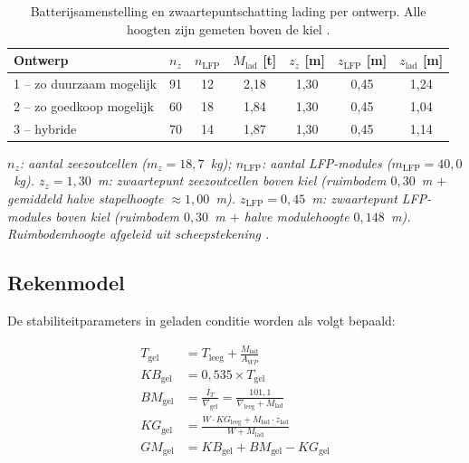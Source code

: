 \begin{table}[H]
\centering
\caption{Batterijsamenstelling en zwaartepuntschatting lading per ontwerp.
         Alle hoogten zijn gemeten boven de kiel \cite{JansjeTekening2026}.}
\label{tab:samenstelling}
\begin{tabular}{lcccccc}
\toprule
Ontwerp & $n_z$ & $n_\mathrm{LFP}$
        & $M_\mathrm{lad}$ [t]
        & $z_z$ [m] & $z_\mathrm{LFP}$ [m] & $z_\mathrm{lad}$ [m] \\
\midrule
1 -- zo duurzaam mogelijk & 91 & 12 & 2{,}18 & 1{,}30 & 0{,}45 & 1{,}24 \\
2 -- zo goedkoop mogelijk & 60 & 18 & 1{,}84 & 1{,}30 & 0{,}45 & 1{,}04 \\
3 -- hybride              & 70 & 14 & 1{,}87 & 1{,}30 & 0{,}45 & 1{,}14 \\
\bottomrule
\end{tabular}
\vspace{4pt}

\noindent\footnotesize
\textit{%
$n_z$: aantal zeezoutcellen ($m_z = 18{,}7$~kg);
$n_\mathrm{LFP}$: aantal LFP-modules ($m_\mathrm{LFP} = 40{,}0$~kg).
$z_z = 1{,}30$~m: zwaartepunt zeezoutcellen boven kiel
(ruimbodem $0{,}30$~m $+$ gemiddeld halve stapelhoogte $\approx 1{,}00$~m).
$z_\mathrm{LFP} = 0{,}45$~m: zwaartepunt LFP-modules boven kiel
(ruimbodem $0{,}30$~m $+$ halve modulehoogte $0{,}148$~m).
Ruimbodemhoogte afgeleid uit scheepstekening \cite{JansjeTekening2026}.}
\end{table}

\subsection{Rekenmodel}
\label{sec:stab_rekenmodel}

De stabiliteitparameters in geladen conditie worden als volgt bepaald:

\begin{align}
    T_\mathrm{gel}  &= T_\mathrm{leeg} + \frac{M_\mathrm{lad}}{A_{WP}}
    \label{eq:T_gel} \\[4pt]
    KB_\mathrm{gel} &= 0{,}535 \times T_\mathrm{gel}
    \label{eq:KB_gel} \\[4pt]
    BM_\mathrm{gel} &= \frac{I_T}{\nabla_\mathrm{gel}}
                     = \frac{101{,}1}{\nabla_\mathrm{leeg} + M_\mathrm{lad}}
    \label{eq:BM_gel} \\[4pt]
    KG_\mathrm{gel} &= \frac{W \cdot KG_\mathrm{leeg}
                            + M_\mathrm{lad} \cdot z_\mathrm{lad}}
                            {W + M_\mathrm{lad}}
    \label{eq:KG_gel} \\[4pt]
    GM_\mathrm{gel} &= KB_\mathrm{gel} + BM_\mathrm{gel} - KG_\mathrm{gel}
    \label{eq:GM_gel}
\end{align}

